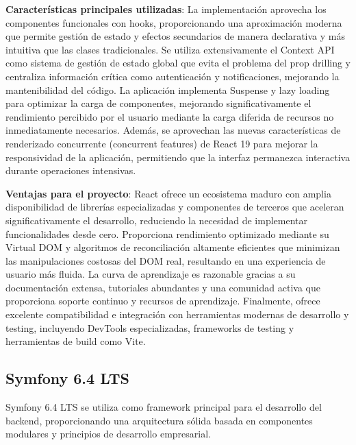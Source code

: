 \documentclass[12pt,a4paper,oneside]{report}
\begin{document}
\textbf{Características principales utilizadas}: La implementación aprovecha los componentes funcionales con hooks, proporcionando una aproximación moderna que permite gestión de estado y efectos secundarios de manera declarativa y más intuitiva que las clases tradicionales. Se utiliza extensivamente el Context API como sistema de gestión de estado global que evita el problema del prop drilling y centraliza información crítica como autenticación y notificaciones, mejorando la mantenibilidad del código. La aplicación implementa Suspense y lazy loading para optimizar la carga de componentes, mejorando significativamente el rendimiento percibido por el usuario mediante la carga diferida de recursos no inmediatamente necesarios. Además, se aprovechan las nuevas características de renderizado concurrente (concurrent features) de React 19 para mejorar la responsividad de la aplicación, permitiendo que la interfaz permanezca interactiva durante operaciones intensivas.

\textbf{Ventajas para el proyecto}: React ofrece un ecosistema maduro con amplia disponibilidad de librerías especializadas y componentes de terceros que aceleran significativamente el desarrollo, reduciendo la necesidad de implementar funcionalidades desde cero. Proporciona rendimiento optimizado mediante su Virtual DOM y algoritmos de reconciliación altamente eficientes que minimizan las manipulaciones costosas del DOM real, resultando en una experiencia de usuario más fluida. La curva de aprendizaje es razonable gracias a su documentación extensa, tutoriales abundantes y una comunidad activa que proporciona soporte continuo y recursos de aprendizaje. Finalmente, ofrece excelente compatibilidad e integración con herramientas modernas de desarrollo y testing, incluyendo DevTools especializadas, frameworks de testing y herramientas de build como Vite.

\subsection{Symfony 6.4 LTS}\label{symfony-6.4-lts}

Symfony 6.4 LTS se utiliza como framework principal para el desarrollo
del backend, proporcionando una arquitectura sólida basada en
componentes modulares y principios de desarrollo empresarial.
\end{document}

